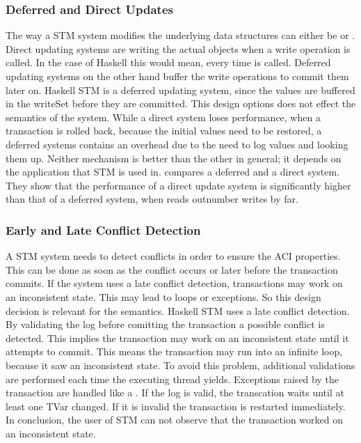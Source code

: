 \subsubsection{Deferred and Direct Updates} The way a STM system modifies the underlying data structures can either be 
or . Direct updating systems are writing the actual objects when a write operation is called. In the case of Haskell 
this would mean, every time  is called. Deferred updating systems on the other hand buffer the write operations to
commit them later on. Haskell STM is a deferred updating system, since the values are buffered in the writeSet before they are
committed. This design options does not effect the semantics of the system. While a direct system loses performance, when a transaction
is rolled back, because the initial values need to be restored, a deferred systems contains an overhead due to the need to log values
and looking them up. Neither mechanism is better than the other in general; it depends on the application that STM is used in. 
\parencite{pessimisticSTM} compares a deferred and a direct system. They show that the performance of a direct update 
system is significantly higher than that of a deferred system, when reads outnumber writes by far.

\subsubsection{Early and Late Conflict Detection} A STM system needs to detect conflicts in order to ensure the ACI properties. This can 
be done as soon as the conflict occurs or later before the transaction commits. If the system uses a late conflict 
detection, transactions may work on an inconsistent state. This may lead to loops or exceptions. So this design decision is 
relevant for the semantics. Haskell STM uses a late conflict detection. By validating the log before comitting the transaction a possible conflict
is detected. This implies the transaction may work on an inconsistent state until it attempts to commit. This means the transaction 
may run into an infinite loop, because it saw an inconsistent state. To avoid this problem, additional validations are performed
each time the executing thread yields. Exceptions raised by the transaction are handled like a . If the log is valid,
the transcation waits until at least one TVar changed. If it is invalid the transaction is restarted immediately.
In conclusion, the user of STM can not observe that the transaction worked on an inconsistent state.

